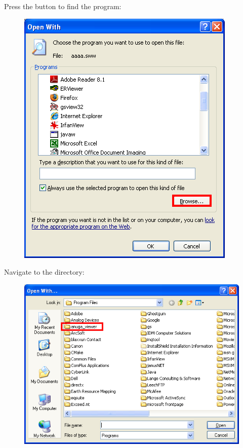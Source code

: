 \documentclass{manual}
\begin{document}
\pagebreak

Press the  button to find the  program:
\begin{figure}[ht]
  \centerline{\includegraphics[scale=0.5]{installgraphics/winassoc3.png}}
  \label{fig:winassoc3}
\end{figure}

Navigate to the  directory:
\begin{figure}[ht]
  \centerline{\includegraphics[scale=0.5]{installgraphics/winassoc4.png}}
  \label{fig:winassoc4}
\end{figure}
\end{document}
